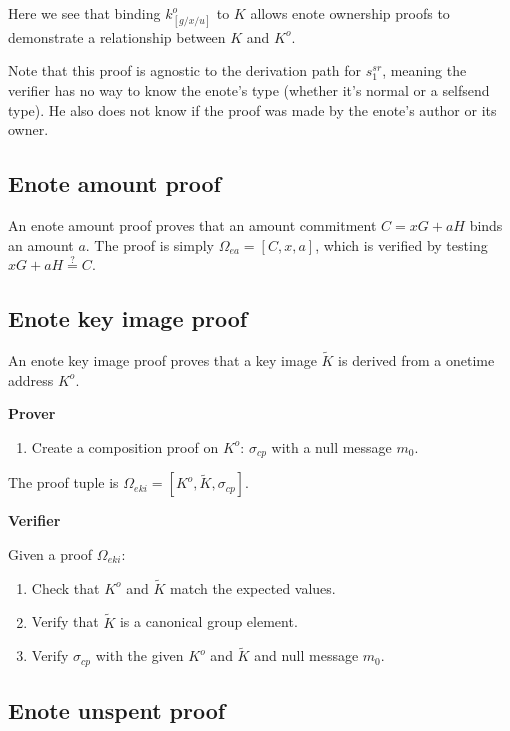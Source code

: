 \begin{appendices}
Here we see that binding $k^o_{[g/x/u]}$ to $K$ allows enote ownership proofs to demonstrate a relationship between $K$ and $K^o$.

Note that this proof is agnostic to the derivation path for $s^{sr}_1$, meaning the verifier has no way to know the enote's type (whether it's normal or a selfsend type). He also does not know if the proof was made by the enote's author or its owner.


\subsection{Enote amount proof}
\label{appendix:jamtis-information-proofs-enote-amount}

An enote amount proof proves that an amount commitment $C = x G + a H$ binds an amount $a$. The proof is simply $\Omega_{ea} = [C, x, a]$, which is verified by testing $x G + a H \stackrel{?}{=} C$.


\subsection{Enote key image proof}
\label{appendix:jamtis-information-proofs-enote-key-image}

An enote key image proof proves that a key image $\tilde{K}$ is derived from a onetime address $K^o$.

\textbf{Prover}

\begin{enumerate}
    \item Create a composition proof on $K^o$: $\sigma_{cp}$ with a null message $m_0$.
\end{enumerate}

The proof tuple is $\Omega_{eki} = [K^o, \tilde{K}, \sigma_{cp}]$.

\textbf{Verifier}

Given a proof $\Omega_{eki}$:

\begin{enumerate}
    \item Check that $K^o$ and $\tilde{K}$ match the expected values.

    \item Verify that $\tilde{K}$ is a canonical group element.

    \item Verify $\sigma_{cp}$ with the given $K^o$ and $\tilde{K}$ and null message $m_0$.
\end{enumerate}


\subsection{Enote unspent proof}
\label{appendix:jamtis-information-proofs-enote-unspent}


\end{appendices}
